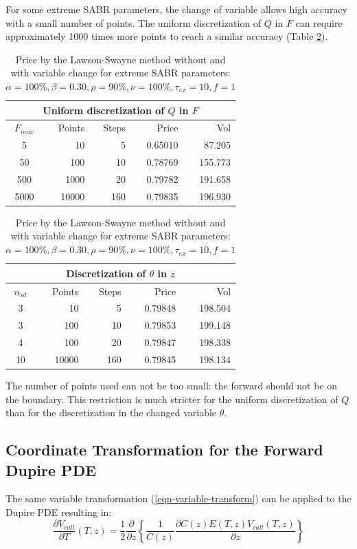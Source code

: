 \documentclass[]{rAMF2e}
\begin{document}
For some extreme SABR parameters, the change of variable allows high accuracy with a small number of points. The uniform discretization of $Q$ in $F$ can require approximately 1000 times more points to reach a similar accuracy (Table \ref{table:discretization}).
\begin{table}[h]
\begin{center}
\begin{tabular}{|c|r|r|r|r|}
	\hline
\multicolumn{5}{|c|}{Uniform discretization of $Q$ in $F$} \\ \hline
$F_{max}$ & Points & Steps & Price & Vol \\
5 & 10 & 5 & 0.65010 & 87.205  \\
50 & 100 & 10 & 0.78769 & 155.773\\
500 & 1000 & 20 & 0.79782 & 191.658 \\
5000 & 10000 & 160 & 0.79835 & 196.930\\
\hline
\end{tabular}
\begin{tabular}{|c|r|r|r|r|}
\hline
\multicolumn{5}{|c|}{Discretization of $\theta$ in $z$} \\ \hline
$n_{sd}$ & Points & Steps & Price & Vol\\
3 & 10 & 5 & 0.79848 & 198.504\\
3 & 100 & 10 & 0.79853 & 199.148\\
4 & 100 & 20 & 0.79847 & 198.338\\
10 & 10000 & 160 & 0.79845 & 198.134\\
\hline
\end{tabular}
\caption{\label{table:discretization}Price by the Lawson-Swayne method without and with variable change for extreme SABR parameters: $\alpha=100\%, \beta=0.30, \rho=90\%, \nu=100\%, \tau_{ex}=10, f=1$}
\end{center}
\end{table} 
The number of points used can not be too small: the forward should not be on the boundary. This restriction is much stricter for the uniform discretization of $Q$ than for the discretization in the changed variable $\theta$.

\subsection{Coordinate Transformation for the Forward Dupire PDE}
The same variable transformation (\ref{eqn-variable-transform}) can be applied to the Dupire PDE resulting in:
\begin{equation}
\frac{\partial V_{call}}{\partial T}(T,z) = \frac{1}{2} \frac{\partial}{\partial z} \left\lbrace \frac{1}{C(z)} \frac{\partial C(z)E(T,z)V_{call}(T,z)}{\partial z} \right\rbrace
\end{equation}
\end{document}
